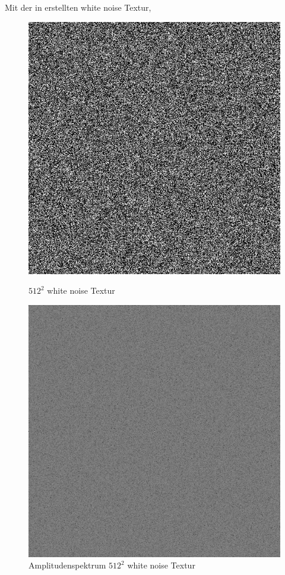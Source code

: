 Mit der in \cite{WhiteNoiseGenerator} erstellten white noise Textur,
\begin{figure}[H]\label{pic:white noise}
    \centering
    \begin{minipage}[t]{0.45\linewidth}
        \centering
        \includegraphics[width=\linewidth]{content/BlueNoise/Bilder/whitenoise.png}
        \caption{$512^{2}$ white noise Textur}
    \end{minipage}
    \hfill
    \begin{minipage}[t]{0.45\linewidth}
        \centering
        \includegraphics[width=\linewidth]{content/BlueNoise/Bilder/FFT_whitenoise.png}
        \caption{Amplitudenspektrum $512^{2}$ white noise Textur}
    \end{minipage}
\end{figure}

